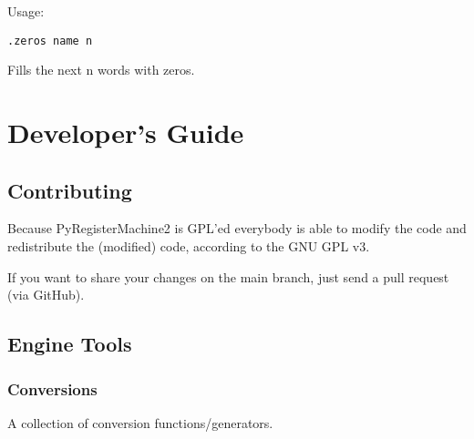 \documentclass[letterpaper,10pt,english]{sphinxmanual}
\begin{document}
\begin{fulllineitems}
\label{tools:py_register_machine2.tools.assembler.directives.Zeros}
Usage:

\begin{Verbatim}[commandchars=\\\{\}]
.zeros name n   
\end{Verbatim}

Fills the next n words with zeros.

\end{fulllineitems}



\chapter{Developer's Guide}
\label{developer_guide::doc}\label{developer_guide:developer-s-guide}

\section{Contributing}
\label{developer_guide:contributing}
Because PyRegisterMachine2 is GPL'ed everybody is able to modify the code and
redistribute the (modified) code, according to the GNU GPL v3.

If you want to share your changes on the main branch, just send a pull request (via GitHub).


\section{Engine Tools}
\label{developer_guide:engine-tools}

\subsection{Conversions}
\label{developer_guide:conversions}\label{developer_guide:module-py_register_machine2.engine_tools.conversions}
A collection of conversion functions/generators.
\end{document}

